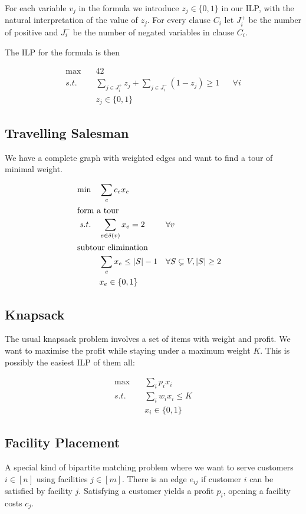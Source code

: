 For each variable $v_j$ in the formula we introduce $z_j \in \{0,1\}$ in our ILP, with the natural interpretation of the value of $z_j$. For every clause $C_i$ let $J^+_i$ be the number of positive and $J^-_i$ be the number of negated variables in clause $C_i$.

The ILP for the formula is then

\begin{align*}
\max \quad & 42 \\
s.t. &\sum_{j\in J^+_i} z_j + \sum_{j\in J^-_i} (1-z_j) \geq 1 && \forall i\\
&z_j \in \{0,1\}
\end{align*}

\subsection{Travelling Salesman}

We have a complete graph with weighted edges and want to find a tour of minimal weight.

\begin{align*}
\min \quad & \sum_e c_e x_e\\
\intertext{form a tour}
s.t. \quad & \sum_{e\in \delta(v)} x_e = 2 && \forall v\\
\intertext{subtour elimination}
	& \sum_e x_e \leq |S|-1 && \forall S \subsetneq V, |S|\geq 2\\ 
	& x_e \in \{0,1\}
\end{align*}

\subsection{Knapsack}

The usual knapsack problem involves a set of items with weight and profit. We want to maximise the profit while staying under a maximum weight $K$. This is possibly the easiest ILP of them all:

\begin{align*}
\max \quad & \sum_i p_ix_i\\
s.t.\quad & \sum_i w_i x_i \leq K\\
	& x_i\in \{0,1\}
\end{align*}


\subsection{Facility Placement}

A special kind of bipartite matching problem where we want to serve customers $i\in [n]$ using facilities $j\in [m]$. There is an edge $e_{ij}$ if customer $i$ can be satisfied by facility $j$. Satisfying a customer yields a profit $p_i$, opening a facility costs $c_j$.

